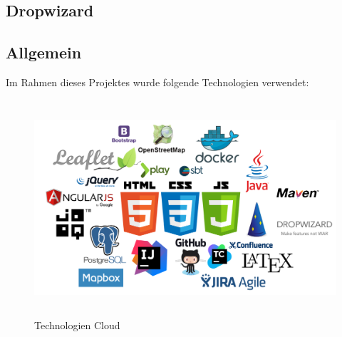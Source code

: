 \subsection*{Dropwizard}
\subsection*{Allgemein}
Im Rahmen dieses Projektes wurde folgende Technologien verwendet:\\
\begin{figure}[H]
\centering
\includegraphics[height=8cm]{images/cloud.png}
\caption{Technologien Cloud}
\label{fig:mainviewpartialview}
\end{figure}
\noindent